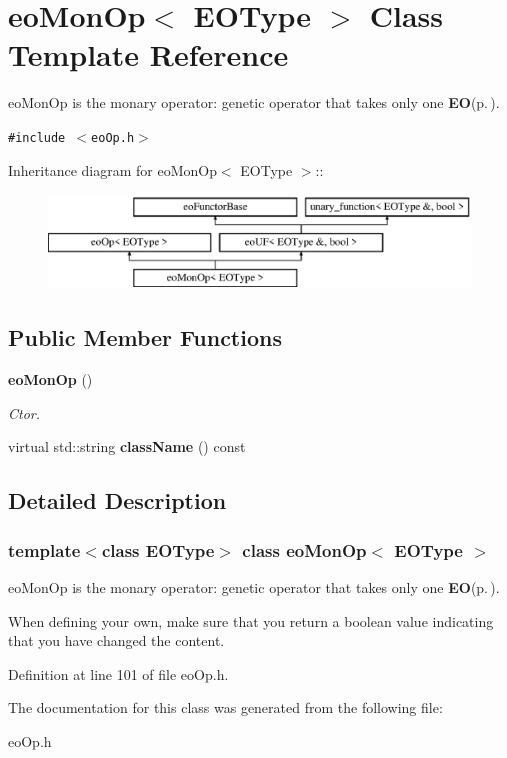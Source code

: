 \section{eo\-Mon\-Op$<$ EOType $>$ Class Template Reference}
\label{classeo_mon_op}
eo\-Mon\-Op is the monary operator: genetic operator that takes only one {\bf EO}{\rm (p.\,\pageref{class_e_o})}.  


{\tt \#include $<$eo\-Op.h$>$}

Inheritance diagram for eo\-Mon\-Op$<$ EOType $>$::\begin{figure}[H]
\begin{center}
\leavevmode
\includegraphics[height=2.52252cm]{classeo_mon_op}
\end{center}
\end{figure}
\subsection*{Public Member Functions}
\begin{CompactItemize}
\item 
{\bf eo\-Mon\-Op} ()\label{classeo_mon_op_a0}

\begin{CompactList}\small\item\em Ctor. \item\end{CompactList}\item 
virtual std::string {\bf class\-Name} () const \label{classeo_mon_op_a1}

\end{CompactItemize}


\subsection{Detailed Description}
\subsubsection*{template$<$class EOType$>$ class eo\-Mon\-Op$<$ EOType $>$}

eo\-Mon\-Op is the monary operator: genetic operator that takes only one {\bf EO}{\rm (p.\,\pageref{class_e_o})}. 

When defining your own, make sure that you return a boolean value indicating that you have changed the content. 



Definition at line 101 of file eo\-Op.h.

The documentation for this class was generated from the following file:\begin{CompactItemize}
\item 
eo\-Op.h\end{CompactItemize}
